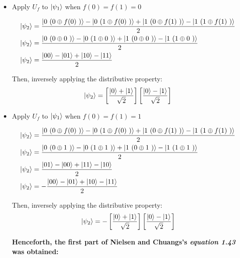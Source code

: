 \begin{itemize}
    \item Apply \(U_f\) to \(\ket{\psi_1}\) when \(f(0) = f(1) = 0\)
    
    \begin{align}
        \ket{\psi_2} &= \frac{\ket{0\ (0 \oplus f(0)\ )} - \ket{0\ (1 \oplus f(0)\ )} +
        \ket{1\ (0 \oplus f(1)\ )} - \ket{1\ (1 \oplus f(1)\ )}}{2}
        \\
        \ket{\psi_2} &=  \frac{\ket{0\ (0 \oplus 0\ )} - \ket{0\ (1 \oplus 0\ )} +
        \ket{1\ (0 \oplus 0\ )} - \ket{1\ (1 \oplus 0\ )}}{2}
        \\
        \ket{\psi_2} &= \frac{\ket{00} - \ket{01} + \ket{10} - \ket{11}}{2}
    \end{align}
    
    Then, inversely applying the distributive property:
    \begin{equation}
        \ket{\psi_2} =
        \left[ \frac{\ket{0} + \ket{1}}{\sqrt{2}} \right]
        \left[ \frac{\ket{0} - \ket{1}}{\sqrt{2}} \right]
    \end{equation}
        
    \item Apply \(U_f\) to \(\ket{\psi_1}\) when \(f(0) = f(1) = 1\)
    
    \begin{align}
        \ket{\psi_2} &= \frac{\ket{0\ (0 \oplus f(0)\ )} - \ket{0\ (1 \oplus f(0)\ )} +
        \ket{1\ (0 \oplus f(1)\ )} - \ket{1\ (1 \oplus f(1)\ )}}{2}
        \\
        \ket{\psi_2} &=  \frac{\ket{0\ (0 \oplus 1\ )} - \ket{0\ (1 \oplus 1\ )} +
        \ket{1\ (0 \oplus 1\ )} - \ket{1\ (1 \oplus 1\ )}}{2}
        \\
        \ket{\psi_2} &= \frac{\ket{01} - \ket{00} + \ket{11} - \ket{10}}{2}
        \\
        \ket{\psi_2} &= - \frac{\ket{00} - \ket{01} + \ket{10} - \ket{11}}{2}
    \end{align}
    
    Then, inversely applying the distributive property:
    \begin{equation}
        \ket{\psi_2} = -
        \left[ \frac{\ket{0} + \ket{1}}{\sqrt{2}} \right]
        \left[ \frac{\ket{0} - \ket{1}}{\sqrt{2}} \right]
    \end{equation}
    
    \textbf{Henceforth, the first part of Nielsen and Chuangs's \emph{equation 1.43} was obtained:}
    

\end{itemize}
